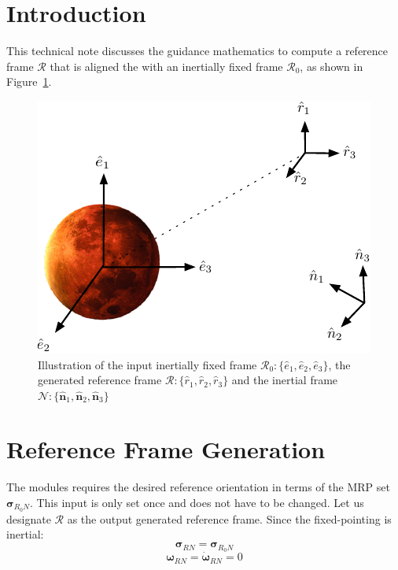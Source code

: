 \documentclass[]{AVSSimReportMemo}
\begin{document}
\section{Introduction}
This technical note discusses the guidance mathematics to compute a reference frame $\mathcal{R}$ that is aligned the with an inertially fixed  frame  $\mathcal{R}_0$, as shown in Figure~\ref{fig:Fig1}.
\begin{figure}[htb]
	\centerline{
	\includegraphics{Figures/Fig3}
	}
	\caption{Illustration of the input inertially fixed frame $\mathcal{R}_{0}:\{ \hat e_{1}, \hat e_{2}, \hat e_{3} \}$, the generated reference frame $\mathcal{R}: \{ \hat r_{1}, \hat r_{2}, \hat r_{3}\}$ and the inertial frame $\mathcal{N}:\{ \hat{\bm n}_{1}, \hat{\bm n}_{2}, \hat{\bm n}_{3} \}$}
	\label{fig:Fig1}
\end{figure}

\section{Reference Frame Generation}
The modules requires the desired reference orientation in terms of the MRP set $\bm{\sigma}_{R_{0}N}$. This input is only set once and does not have to be changed.
Let us designate $\mathcal{R}$ as the output generated reference frame. Since the fixed-pointing is inertial:
\begin{equation}
	\bm{\sigma}_{RN} = \bm{\sigma}_{R_{0}N}
\end{equation}
\begin{equation}
	\bm{\omega}_{RN} = \dot{\bm{\omega}}_{RN} = 0
\end{equation}



\end{document}
